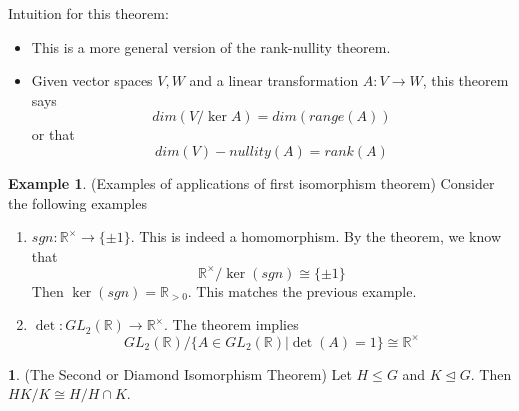 \documentclass[12pt]{article}
\theoremstyle{definition}
\newcommand{\R}{\mathbb{R}}
\newtheorem{theorem}{\color{ForestGreen}{\textbf{Theorem}}}
\newtheorem{example}{\color{WildStrawberry}Example}
\theoremstyle{definition}
\begin{document}
Intuition for this theorem:
\begin{itemize}
	\item This is a more general version of the rank-nullity theorem.
	\item Given vector spaces $V, W$ and a linear transformation $A : V \to W$, this theorem says
	\begin{equation}
		dim( V / \ker A ) = dim (range(A))
	\end{equation}
	or that
	\begin{equation}
		dim(V) - nullity(A) = rank(A)
	\end{equation}
\end{itemize}

\begin{example}(Examples of applications of first isomorphism theorem) Consider the following examples
\begin{enumerate}
	\item $sgn : \R^{\times} \to \{\pm 1 \}$. This is indeed a homomorphism. By the theorem, we know that
	\begin{equation}
		\R^{\times} /\ker(sgn) \cong \{ \pm 1\}
	\end{equation}
	Then $\ker(sgn) = \R_{>0}$. This matches the previous example. 
	\item $\det : GL_2(\mathbb{R}) \to \R^{\times}$. The theorem implies
	\begin{equation}
		GL_2(\mathbb{R}) / \{A \in GL_2(\mathbb{R}) | \det(A) = 1 \} \cong \R^{\times}
	\end{equation}
\end{enumerate}

\end{example}

\begin{theorem}(The Second or Diamond Isomorphism Theorem)
Let $H \leq G$ and $K \trianglelefteq G$. Then $HK / K \cong H / H \cap K$. 
\end{theorem}
\end{document}
